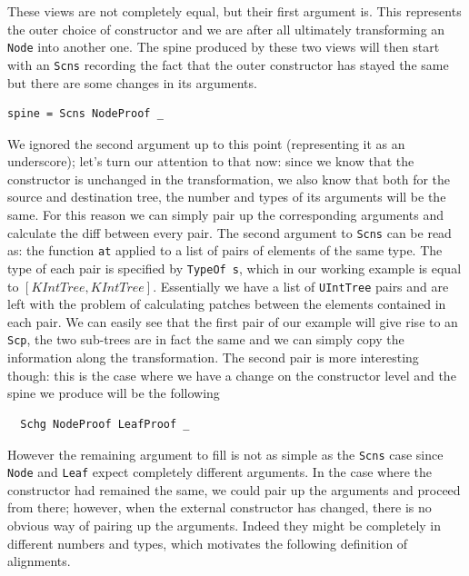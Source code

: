 \documentclass[11pt, titlepage]{article}
\begin{document}
These views are not completely equal, but their first argument is. This represents the outer choice 
of constructor and we are after all ultimately transforming an \texttt{Node} into another one. The spine produced
by these two views will then start with an \texttt{Scns} recording the fact that 
the outer constructor has stayed the same but there are some changes in its 
arguments.

\begin{verbatim}
spine = Scns NodeProof _
\end{verbatim}

We ignored the second argument up to this point (representing it as an underscore); let's turn our attention to 
that now: since we know that the constructor is unchanged in the transformation, we also know that 
both for the source and destination tree, the number and types of its arguments 
will be the same. For this reason we can simply pair up the corresponding 
arguments and calculate the diff between every pair. The second argument to \texttt{Scns} can be read as: the function 
\texttt{at} applied to a list of pairs of elements of the same type. The type of each 
pair is specified by \texttt{TypeOf s}, which in our working example is equal to 
$[KIntTree, KIntTree]$. Essentially we have a list of \texttt{UIntTree} pairs and are 
left with the problem of calculating patches between the elements contained in 
each pair. 
We can easily see that the first pair of our example will give rise to an 
\texttt{Scp}, the two sub-trees are in fact the same and we can simply copy the 
information along the transformation. The second pair is more interesting 
though: this is the case where we have a change on the constructor level and the 
spine we produce will be the following
\begin{verbatim}
  Schg NodeProof LeafProof _
\end{verbatim}
However the remaining argument to fill is not as simple as the \texttt{Scns} 
case since \texttt{Node} and \texttt{Leaf} expect completely different 
arguments.
In the case where the constructor had remained the same, we could 
pair up the arguments and proceed from there; however, when the
external constructor has changed, there is no obvious way of pairing up
the arguments. Indeed they might be completely in different numbers and types, which 
motivates the following definition of alignments.
\end{document}
